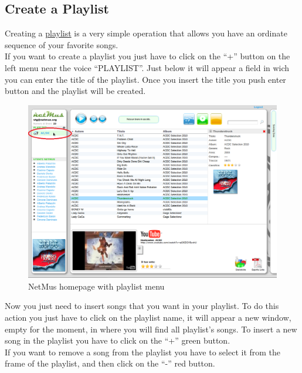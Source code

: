 \subsection*{Create a Playlist}

Creating a \underline{playlist} is a very simple operation that allows you have
an ordinate sequence of your favorite songs.\\
If you want to create a playlist you just have to click on the ``+'' button on
the left menu near the voice ``PLAYLIST''. Just below it will appear a field in
wich you can enter the title of the playlist. Once you insert the title you push
enter button and the playlist will be created.\\

\begin{figure}[htbp]
  \centering
  \includegraphics[width=15cm]{img/MU/new_playlist.png}
\caption{NetMus homepage with playlist menu}
\end{figure}

Now you just need to insert songs that you want in your playlist. To do this
action you just have to click on the playlist name, it will appear a new window,
empty for the moment, in where you will find all playlist's songs. To insert a
new song in the playlist you have to click on the ``+'' green button.\\
If you want to remove a song from the playlist you have to select it from the
frame of the playlist, and then click on the ``-''
red button.\\

